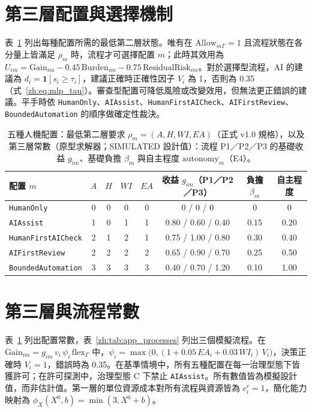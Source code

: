 \section{第三層配置與選擇機制}

表~\ref{zh:tab:app_configs} 列出每種配置所需的最低第二層狀態。唯有在 $\mathrm{Allow}_{m\Gamma}=1$ 且流程狀態在各分量上皆滿足 $\rho_m$ 時，流程才可選擇配置 $m$；此時其效用為 $U_{im}=\mathrm{Gain}_{im}-0.45\,\mathrm{Burden}_{im}-0.75\,\mathrm{ResidualRisk}_{im}$。對於選擇型流程，AI 的建議為 $d_i=\mathbf{1}[s_i\geq\tau_i]$，建議正確時正確性因子 $V_i$ 為 1，否則為 0.35（式~\eqref{zh:eq:mlp_tau}）。審查型配置可降低風險或改變效用，但無法更正錯誤的建議。平手時依 \texttt{HumanOnly}、\texttt{AIAssist}、\texttt{HumanFirstAICheck}、\texttt{AIFirstReview}、\texttt{BoundedAutomation} 的順序做確定性裁決。

\begin{table}[tbp]
\centering
\caption{五種人機配置：最低第二層要求 $\rho_m=(A,H,WI,EA)$（正式 v1.0 規格），以及第三層常數（原型求解器；SIMULATED 設計值）：流程 P1／P2／P3 的基礎收益 $g_{im}$、基礎負擔 $\beta_m$ 與自主程度 $\mathrm{autonomy}_m$（E4）。}
\label{zh:tab:app_configs}
\footnotesize
\begin{tabular}{lccccccc}
\toprule
配置 $m$ & $A$ & $H$ & $WI$ & $EA$ & 收益 $g_{im}$（P1／P2／P3） & 負擔 $\beta_m$ & 自主程度 \\
\midrule
\texttt{HumanOnly} & 0 & 0 & 0 & 0 & 0 / 0 / 0 & 0 & 0 \\
\texttt{AIAssist} & 1 & 0 & 1 & 1 & 0.80 / 0.60 / 0.40 & 0.15 & 0.20 \\
\texttt{HumanFirstAICheck} & 2 & 1 & 2 & 1 & 0.75 / 1.00 / 0.80 & 0.30 & 0.40 \\
\texttt{AIFirstReview} & 2 & 2 & 2 & 2 & 0.65 / 0.90 / 0.70 & 0.25 & 0.50 \\
\texttt{BoundedAutomation} & 3 & 3 & 3 & 3 & 0.40 / 0.70 / 1.20 & 0.10 & 1.00 \\
\bottomrule
\end{tabular}
\end{table}

\section{第三層與流程常數}
\label{zh:app:mlp_constants}

表~\ref{zh:tab:app_configs} 列出配置常數，表~\ref{zh:tab:app_processes} 列出三個模擬流程。在 $\mathrm{Gain}_{im}=g_{im}\,v_i\,\psi_i\,\mathrm{flex}_\Gamma$ 中，$\psi_i=\max\bigl(0,(1+0.05\,EA_i+0.03\,WI_i)\,V_i\bigr)$，決策正確時 $V_i=1$，錯誤時為 0.35。在基準情境中，所有五種配置在每一治理型態下皆獲許可；在許可探測中，治理型態 C 下禁止 \texttt{AIAssist}。所有數值皆為模擬設計值，而非估計值。第一層的單位資源成本對所有流程與資源皆為 $c_i^r = 1$，簡化能力映射為 $\phi_X(X^0,b)=\min(3,X^0+b)$。

